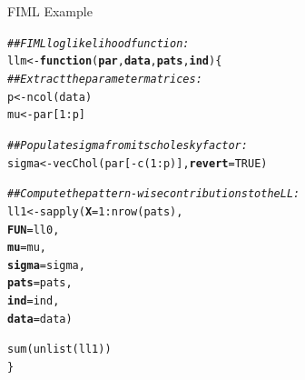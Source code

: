 \documentclass{beamer}\usepackage[]{graphicx}\usepackage[]{color}
\makeatletter
\newcommand{\hlnum}[1]{\textcolor[rgb]{0.69,0.494,0}{#1}}%
\newcommand{\hlcom}[1]{\textcolor[rgb]{0.514,0.506,0.514}{\textit{#1}}}%
\newcommand{\hlopt}[1]{\textcolor[rgb]{0,0,0}{#1}}%
\newcommand{\hlstd}[1]{\textcolor[rgb]{0,0,0}{#1}}%
\newcommand{\hlkwa}[1]{\textcolor[rgb]{0,0,0}{\textbf{#1}}}%
\newcommand{\hlkwb}[1]{\textcolor[rgb]{0,0.341,0.682}{#1}}%
\newcommand{\hlkwc}[1]{\textcolor[rgb]{0,0,0}{\textbf{#1}}}%
\newcommand{\hlkwd}[1]{\textcolor[rgb]{0.004,0.004,0.506}{#1}}%
\newenvironment{kframe}{%
 \def\at@end@of@kframe{}%
 \ifinner\ifhmode%
  \def\at@end@of@kframe{\end{minipage}}%
  \begin{minipage}{\columnwidth}%
 \fi\fi%
 \def\FrameCommand##1{\hskip\@totalleftmargin \hskip-\fboxsep
 \colorbox{shadecolor}{##1}\hskip-\fboxsep
     \hskip-\linewidth \hskip-\@totalleftmargin \hskip\columnwidth}%
 \MakeFramed {\advance\hsize-\width
   \@totalleftmargin\z@ \linewidth\hsize
   \@setminipage}}%
 {\par\unskip\endMakeFramed%
 \at@end@of@kframe}
\newenvironment{knitrout}{}{} %
\makeatother
\begin{document}
\begin{frame}[fragile]{FIML Example}

\begin{knitrout}\scriptsize
{}\color{fgcolor}\begin{kframe}
\begin{alltt}
\hlcom{## FIML loglikelihood function:}
\hlstd{llm} \hlkwb{<-} \hlkwa{function}\hlstd{(}\hlkwc{par}\hlstd{,} \hlkwc{data}\hlstd{,} \hlkwc{pats}\hlstd{,} \hlkwc{ind}\hlstd{) \{}
    \hlcom{## Extract the parameter matrices:}
    \hlstd{p}  \hlkwb{<-} \hlkwd{ncol}\hlstd{(data)}
    \hlstd{mu} \hlkwb{<-} \hlstd{par[}\hlnum{1} \hlopt{:} \hlstd{p]}

    \hlcom{## Populate sigma from its cholesky factor:}
    \hlstd{sigma} \hlkwb{<-}\hlkwd{vecChol}\hlstd{(par[}\hlopt{-}\hlkwd{c}\hlstd{(}\hlnum{1} \hlopt{:} \hlstd{p)],} \hlkwc{revert} \hlstd{=} \hlnum{TRUE}\hlstd{)}

    \hlcom{## Compute the pattern-wise contributions to the LL:}
    \hlstd{ll1} \hlkwb{<-} \hlkwd{sapply}\hlstd{(}\hlkwc{X}     \hlstd{=} \hlnum{1} \hlopt{:} \hlkwd{nrow}\hlstd{(pats),}
                  \hlkwc{FUN}   \hlstd{= ll0,}
                  \hlkwc{mu}    \hlstd{= mu,}
                  \hlkwc{sigma} \hlstd{= sigma,}
                  \hlkwc{pats}  \hlstd{= pats,}
                  \hlkwc{ind}   \hlstd{= ind,}
                  \hlkwc{data}  \hlstd{= data)}

    \hlkwd{sum}\hlstd{(}\hlkwd{unlist}\hlstd{(ll1))}
\hlstd{\}}
\end{alltt}
\end{kframe}
\end{knitrout}

\end{frame}

\end{document}

